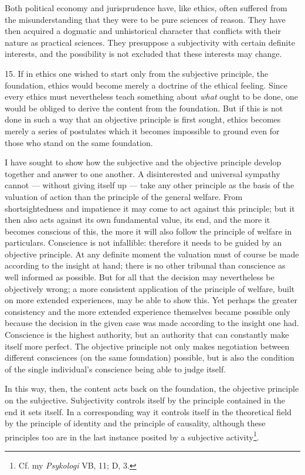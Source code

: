 \documentclass[12pt,a4paper,openany]{book}
\newcommand{\opage}[1]{\marginnote{\footnotesize\textit{[#1]}}}
\begin{document}
Both political economy and jurisprudence have, like ethics, often suffered from the misunderstanding
that they were to be pure sciences of reason. They have then acquired a dogmatic and unhistorical
character that conflicts with their nature as practical sciences. They presuppose a subjectivity with
certain definite interests, and the possibility is not excluded that these interests may change.

15. If in ethics one wished to start only from the subjective principle, the foundation, ethics would
become merely a doctrine of the ethical feeling. Since every ethics must nevertheless teach something
about \textit{what} ought to be done, one would be obliged to derive the content from the foundation.
But if this is not done in such a way that an objective principle is first sought, ethics becomes
merely a series of postulates which it becomes impossible to ground even for those who stand on the
same foundation.

\opage{54}I have sought to show how the subjective and the objective principle develop together and answer to
one another. A disinterested and universal sympathy cannot --- without giving itself up --- take any
other principle as the basis of the valuation of action than the principle of the general welfare.
From shortsightedness and impatience it may come to act against this principle; but it then also acts
against its own fundamental value, its end, and the more it becomes conscious of this, the more it
will also follow the principle of welfare in particulars. Conscience is not infallible: therefore it
needs to be guided by an objective principle. At any definite moment the valuation must of course be
made according to the insight at hand; there is no other tribunal than conscience as well informed as
possible. But for all that the decision may nevertheless be objectively wrong; a more consistent
application of the principle of welfare, built on more extended experiences, may be able to show
this. Yet perhaps the greater consistency and the more extended experience themselves became possible
only because the decision in the given case was made according to the insight one had. Conscience is
the highest authority, but an authority that can constantly make itself more perfect. The objective
principle not only makes negotiation between different consciences (on the same foundation)
possible, but is also the condition of the single individual's conscience being able to judge itself.

In this way, then, the content acts back on the foundation, the objective principle on the
subjective. Subjectivity controls itself by the principle contained in the end it sets itself. In a
corresponding way it controls itself in the theoretical field by the principle of identity and the
principle of causality, although these principles too are in the last instance posited by a
subjective activity\footnote[1]{Cf. my \textit{Psykologi} VB, 11; D, 3.}.
\end{document}
